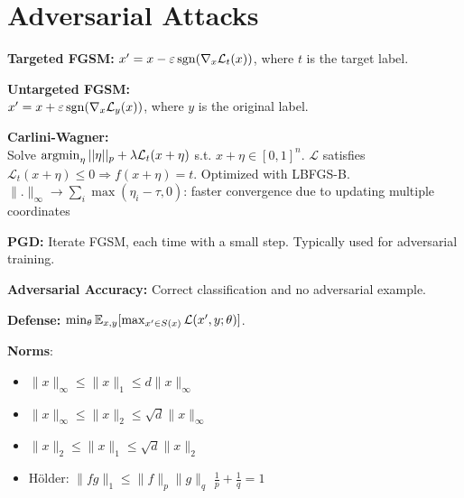 \section{Adversarial Attacks}
\textbf{Targeted FGSM:} $x^\prime = x - \varepsilon \operatorname{\operatorname{sgn}}(\nabla_x \mathcal{L}_t(x))$, where $t$ is the target label.

\textbf{Untargeted FGSM:} \\$x^\prime = x + \varepsilon \operatorname{\operatorname{sgn}}(\nabla_x \mathcal{L}_y (x))$, where $y$ is the original label.

\textbf{Carlini-Wagner:}\\
Solve $\operatorname{\operatorname{argmin}}_\eta ||\eta||_p+\lambda \mathcal{L}_t(x+\eta)$ s.t. $x+\eta\in [0,1]^n$. $\mathcal{L}$ satisfies $\mathcal{L}_t(x+\eta)\le 0 \Rightarrow f(x+\eta)=t$. Optimized with LBFGS-B.\\
$\|.\|_{\infty}\rightarrow\sum_i \max(\eta_i-\tau,0)$: faster convergence due to updating multiple coordinates

\textbf{PGD:} Iterate FGSM, each time with a small step. Typically used for adversarial training.

\textbf{Adversarial Accuracy:} Correct classification and no adversarial example.

\textbf{Defense:} $\min_\theta \mathbb{E}_{x,y} [\max_{x^\prime\in S(x)} \mathcal{L}(x^\prime, y; \theta)]$.

\textbf{Norms}:
\begin{itemize}
    \item[] $\|x\|_\infty\leq\|x\|_1\leq d\|x\|_\infty$
    \item[] $\|x\|_\infty\leq\|x\|_2\leq\sqrt{d}\|x\|_\infty$
    \item[] $\|x\|_2\leq\|x\|_1\leq\sqrt{d}\|x\|_2$
    \item[] Hölder: $\|fg\|_1\leq\|f\|_p\|g\|_q$  $\frac{1}{p}+\frac{1}{q}=1$
\end{itemize}
